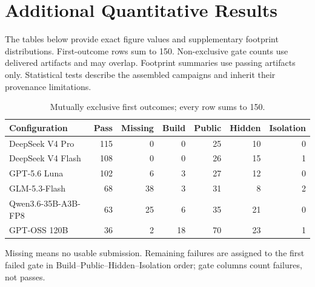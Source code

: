 \documentclass[acmsmall,screen,review,anonymous,nonacm]{acmart}
\begin{document}
\section{Additional Quantitative Results}
\label{app:quantitative}
The tables below provide exact figure values and supplementary footprint
distributions.
First-outcome rows sum to 150. Non-exclusive gate counts use delivered artifacts
and may overlap. Footprint summaries use passing artifacts only. Statistical
tests describe the assembled campaigns and inherit their provenance limitations.

\begin{table}[tbp]
 \caption{Mutually exclusive first outcomes; every row sums to 150.}
 \label{tab:funnel}
 \centering\small
 \setlength{\tabcolsep}{4pt}
 \renewcommand{\arraystretch}{1.12}
 \begin{tabularx}{\linewidth}{@{}Xrrrrrr@{}}
 \toprule
 Configuration & Pass & Missing & Build & Public & Hidden & Isolation \\
 \midrule
 DeepSeek V4 Pro & 115 & 0 & 0 & 25 & 10 & 0 \\
 DeepSeek V4 Flash & 108 & 0 & 0 & 26 & 15 & 1 \\
 GPT-5.6 Luna & 102 & 6 & 3 & 27 & 12 & 0 \\
 GLM-5.3-Flash & 68 & 38 & 3 & 31 & 8 & 2 \\
 Qwen3.6-35B-A3B-FP8 & 63 & 25 & 6 & 35 & 21 & 0 \\
 GPT-OSS 120B & 36 & 2 & 18 & 70 & 23 & 1 \\
 \bottomrule
 \end{tabularx}
 \par\smallskip\begin{minipage}{\linewidth}\footnotesize
 Missing means no usable submission. Remaining failures are assigned to the first failed gate in Build--Public--Hidden--Isolation order; gate columns count failures, not passes.
 \end{minipage}
\end{table}
\end{document}
